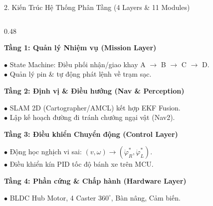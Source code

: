 \documentclass[aspectratio=169,9pt]{beamer}
\newcommand{\smallnote}[1]{{\fontsize{7.1}{8.4}\selectfont #1\par}}
\newcommand{\heading}[1]{{\bfseries\color{PTITRed} #1\par}}
\begin{document}
\begin{frame}{2. Kiến Trúc Hệ Thống Phân Tầng (4 Layers \& 11 Modules)}
  \vspace{0.02cm}
  \begin{columns}[T,onlytextwidth]
    \begin{column}{0.48\textwidth}
      \begin{tcolorbox}[titlepanel,title=Mô hình kiến trúc 4 tầng chức năng]
        \heading{Tầng 1: Quản lý Nhiệm vụ (Mission Layer)}
        \smallnote{$\bullet$ State Machine: Điều phối nhận/giao khay A $\rightarrow$ B $\rightarrow$ C $\rightarrow$ D.\\
        $\bullet$ Quản lý pin \& tự động phát lệnh về trạm sạc.}
        \vspace{0.06cm}
        \heading{Tầng 2: Định vị \& Điều hướng (Nav \& Perception)}
        \smallnote{$\bullet$ SLAM 2D (Cartographer/AMCL) kết hợp EKF Fusion.\\
        $\bullet$ Lập kế hoạch đường đi tránh chướng ngại vật (Nav2).}
        \vspace{0.06cm}
        \heading{Tầng 3: Điều khiển Chuyển động (Control Layer)}
        \smallnote{$\bullet$ Động học nghịch vi sai: $(v, \omega) \rightarrow (\dot{\varphi}_R^*, \dot{\varphi}_L^*)$.\\
        $\bullet$ Điều khiển kín PID tốc độ bánh xe trên MCU.}
        \vspace{0.06cm}
        \heading{Tầng 4: Phần cứng \& Chấp hành (Hardware Layer)}
        \smallnote{$\bullet$ BLDC Hub Motor, 4 Caster $360^\circ$, Bàn nâng, Cảm biến.}
      \end{tcolorbox}
    \end{column}


\end{columns}
\end{frame}
\end{document}
